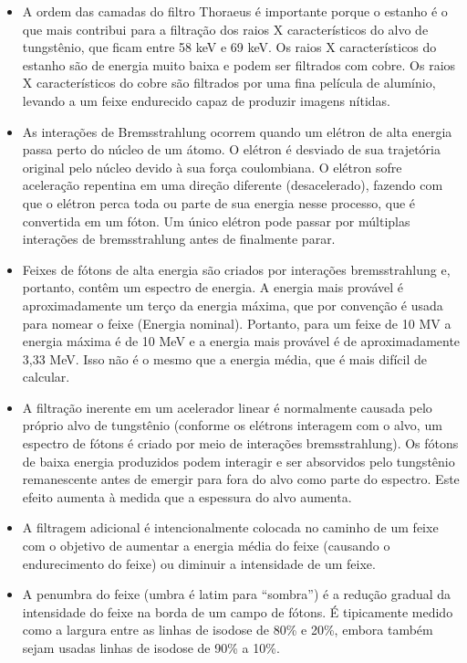 \documentclass[11pt,a4paper]{article}
\newcounter{exemplo}
\begin{document}
\begin{exemplo}
\begin{itemize}
        \item A ordem das camadas do filtro Thoraeus é importante porque o estanho é o que mais contribui para a filtração dos raios X característicos do alvo de tungstênio, que ficam entre 58 keV e 69 keV. Os raios X característicos do estanho são de energia muito baixa e podem ser filtrados com cobre. Os raios X característicos do cobre são filtrados por uma fina película de alumínio, levando a um feixe endurecido capaz de produzir imagens nítidas.
        
        \item As interações de Bremsstrahlung ocorrem quando um elétron de alta energia passa perto do núcleo de um átomo. O elétron é desviado de sua trajetória original pelo núcleo devido à sua força coulombiana. O elétron sofre aceleração repentina em uma direção diferente (desacelerado), fazendo com que o elétron perca toda ou parte de sua energia nesse processo, que é convertida em um fóton. Um único elétron pode passar por múltiplas interações de bremsstrahlung antes de finalmente parar.
        
        \item Feixes de fótons de alta energia são criados por interações bremsstrahlung e, portanto, contêm um espectro de energia. A energia mais provável é aproximadamente um terço da energia máxima, que por convenção é usada para nomear o feixe (Energia nominal). Portanto, para um feixe de 10 MV a energia máxima é de 10 MeV e a energia mais provável é de aproximadamente 3,33 MeV. Isso não é o mesmo que a energia média, que é mais difícil de calcular.
        
        \item A filtração inerente em um acelerador linear é normalmente causada pelo próprio alvo de tungstênio (conforme os elétrons interagem com o alvo, um espectro de fótons é criado por meio de interações bremsstrahlung). Os fótons de baixa energia produzidos podem interagir e ser absorvidos pelo tungstênio remanescente antes de emergir para fora do alvo como parte do espectro. Este efeito aumenta à medida que a espessura do alvo aumenta. 
        
        \item A filtragem adicional é intencionalmente colocada no caminho de um feixe com o objetivo de aumentar a energia média do feixe (causando o endurecimento do feixe) ou diminuir a intensidade de um feixe.
        
        \item A penumbra do feixe (umbra é latim para “sombra”) é a redução gradual da intensidade do feixe na borda de um campo de fótons. É tipicamente medido como a largura entre as linhas de isodose de 80\% e 20\%, embora também sejam usadas linhas de isodose de 90\% a 10\%.
        

\end{itemize}
\end{exemplo}
\end{document}
